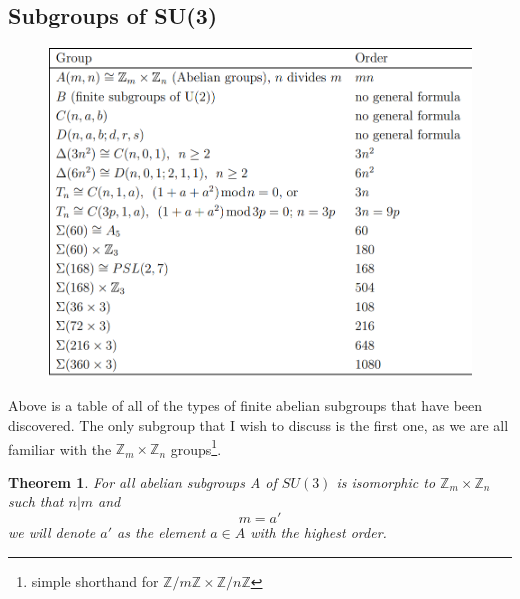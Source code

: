 \documentclass[12pt,journal,compsoc]{IEEEtran}
\newcommand{\Z}{\mathbb{Z}}
\newtheorem{thm}{Theorem}[section]
\begin{document}
\subsection{Subgroups of SU(3)}

\begin{figure}[h!]
	\includegraphics[scale=0.3]{img.png}
\end{figure}
Above is a table of all of the types of finite abelian subgroups that have been discovered. The only subgroup that I wish to discuss is the first one, as we are all familiar with the $\Z_m \times \Z_n$ groups\footnote{simple shorthand for $\Z/m\Z \times \Z/n\Z$}.
\begin{thm}
For all abelian subgroups A of $SU(3)$ is isomorphic to $\Z_m \times \Z_n$ such that $n|m$ and
\[ m = a' \]
we will denote $a'$ as the element $a \in A$ with the highest order.
\end{thm}
\end{document}

